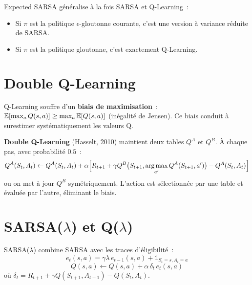 \begin{remarque}
Expected SARSA g\'en\'eralise \`a la fois SARSA et Q-Learning~:
\begin{itemize}
    \item Si $\pi$ est la politique $\epsilon$-gloutonne courante, c'est une
    version \`a variance r\'eduite de SARSA.
    \item Si $\pi$ est la politique gloutonne, c'est exactement Q-Learning.
\end{itemize}
\end{remarque}

\section{Double Q-Learning}

\begin{attention}[title=\textbf{Biais de maximisation}]
Q-Learning souffre d'un \textbf{biais de maximisation}~: $\mathbb{E}[\max_a Q(s,a)] \geq
\max_a \mathbb{E}[Q(s,a)]$ (in\'egalit\'e de Jensen). Ce biais conduit \`a surestimer
syst\'ematiquement les valeurs Q.
\end{attention}

\begin{definition}
\textbf{Double Q-Learning} (Hasselt, 2010) maintient deux tables $Q^A$ et $Q^B$.
\`A chaque pas, avec probabilit\'e $0.5$~:
\[
    Q^A(S_t, A_t) \leftarrow Q^A(S_t, A_t) + \alpha \Big[
    R_{t+1} + \gamma Q^B\big(S_{t+1}, \operatorname*{arg\,max}_{a'} Q^A(S_{t+1}, a')\big) - Q^A(S_t, A_t) \Big]
\]
ou on met \`a jour $Q^B$ sym\'etriquement. L'action est s\'electionn\'ee par une
table et \'evalu\'ee par l'autre, \'eliminant le biais.
\end{definition}

\section{SARSA($\lambda$) et Q($\lambda$)}

\begin{definition}
SARSA($\lambda$) combine SARSA avec les traces d'\'eligibilit\'e~:
\[
    e_t(s,a) = \gamma \lambda \, e_{t-1}(s,a) + \mathbb{1}_{S_t=s, A_t=a}
\]
\[
    Q(s,a) \leftarrow Q(s,a) + \alpha \, \delta_t \, e_t(s,a)
\]
o\`u $\delta_t = R_{t+1} + \gamma Q(S_{t+1}, A_{t+1}) - Q(S_t, A_t)$.
\end{definition}

